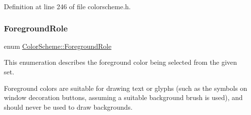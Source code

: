Definition at line 246 of file colorscheme.\+h.

\mbox{\label{class_color_scheme_ab0f331e829838e82757088db8ce32ab4}} 
\subsubsection{\texorpdfstring{Foreground\+Role}{ForegroundRole}}
{\footnotesize\ttfamily enum \hyperlink{class_color_scheme_ab0f331e829838e82757088db8ce32ab4}{Color\+Scheme\+::\+Foreground\+Role}}

This enumeration describes the foreground color being selected from the given set.

Foreground colors are suitable for drawing text or glyphs (such as the symbols on window decoration buttons, assuming a suitable background brush is used), and should never be used to draw backgrounds.

